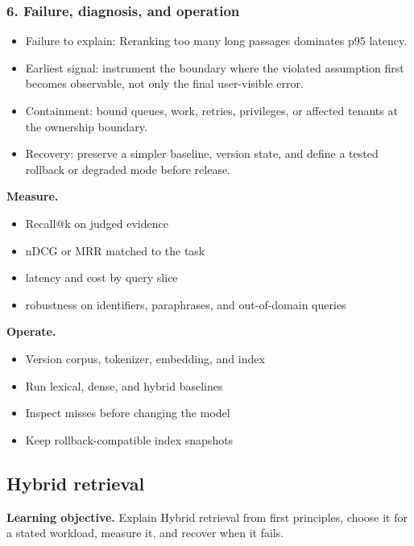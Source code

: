 \subsubsection*{6. Failure, diagnosis, and operation}
\begin{itemize}
\item Failure to explain: Reranking too many long passages dominates p95 latency.
\item Earliest signal: instrument the boundary where the violated assumption first becomes observable, not only the final user-visible error.
\item Containment: bound queues, work, retries, privileges, or affected tenants at the ownership boundary.
\item Recovery: preserve a simpler baseline, version state, and define a tested rollback or degraded mode before release.
\end{itemize}
\textbf{Measure.}\begin{itemize}
\item Recall@k on judged evidence
\item nDCG or MRR matched to the task
\item latency and cost by query slice
\item robustness on identifiers, paraphrases, and out-of-domain queries
\end{itemize}
\textbf{Operate.}\begin{itemize}
\item Version corpus, tokenizer, embedding, and index
\item Run lexical, dense, and hybrid baselines
\item Inspect misses before changing the model
\item Keep rollback-compatible index snapshots
\end{itemize}
\subsection{Hybrid retrieval}
\textbf{Learning objective.} Explain Hybrid retrieval from first principles, choose it for a stated workload, measure it, and recover when it fails.
